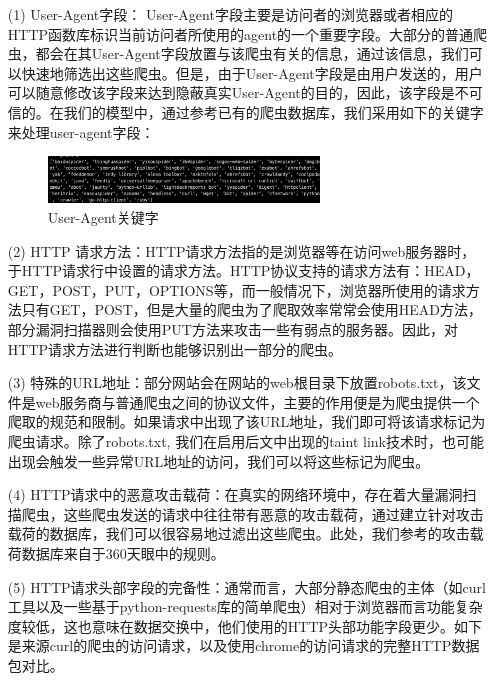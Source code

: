 \documentclass[doctor,privacy,twoside]{buaa_mac}
\begin{document}
\begin{itemize}
\item[(1)] User-Agent字段： User-Agent字段主要是访问者的浏览器或者相应的HTTP函数库标识当前访问者所使用的agent的一个重要字段。大部分的普通爬虫，都会在其User-Agent字段放置与该爬虫有关的信息，通过该信息，我们可以快速地筛选出这些爬虫。但是，由于User-Agent字段是由用户发送的，用户可以随意修改该字段来达到隐蔽真实User-Agent的目的，因此，该字段是不可信的。在我们的模型中，通过参考已有的爬虫数据库，我们采用如下的关键字来处理user-agent字段：
    
\centerline{}
\begin{figure}[!h]
  \centering
  \includegraphics[width=0.68\textwidth]{images/crawler_key_words.png}
  \caption{User-Agent关键字}
  \label{fig:logo}
\end{figure}
\centerline{}
    
\item[(2)] HTTP 请求方法：HTTP请求方法指的是浏览器等在访问web服务器时，于HTTP请求行中设置的请求方法。HTTP协议支持的请求方法有：HEAD，GET，POST，PUT，OPTIONS等，而一般情况下，浏览器所使用的请求方法只有GET，POST，但是大量的爬虫为了爬取效率常常会使用HEAD方法，部分漏洞扫描器则会使用PUT方法来攻击一些有弱点的服务器。因此，对HTTP请求方法进行判断也能够识别出一部分的爬虫。

\item[(3)] 特殊的URL地址：部分网站会在网站的web根目录下放置robots.txt，该文件是web服务商与普通爬虫之间的协议文件，主要的作用便是为爬虫提供一个爬取的规范和限制。如果请求中出现了该URL地址，我们即可将该请求标记为爬虫请求。除了robots.txt, 我们在启用后文中出现的taint link技术时，也可能出现会触发一些异常URL地址的访问，我们可以将这些标记为爬虫。

\item[(4)] HTTP请求中的恶意攻击载荷：在真实的网络环境中，存在着大量漏洞扫描爬虫，这些爬虫发送的请求中往往带有恶意的攻击载荷，通过建立针对攻击载荷的数据库，我们可以很容易地过滤出这些爬虫。此处，我们参考的攻击载荷数据库来自于360天眼中的规则。

\item[(5)] HTTP请求头部字段的完备性：通常而言，大部分静态爬虫的主体（如curl工具以及一些基于python-requests库的简单爬虫）相对于浏览器而言功能复杂度较低，这也意味在数据交换中，他们使用的HTTP头部功能字段更少。如下是来源curl的爬虫的访问请求，以及使用chrome的访问请求的完整HTTP数据包对比。
\end{itemize}
\end{document}
